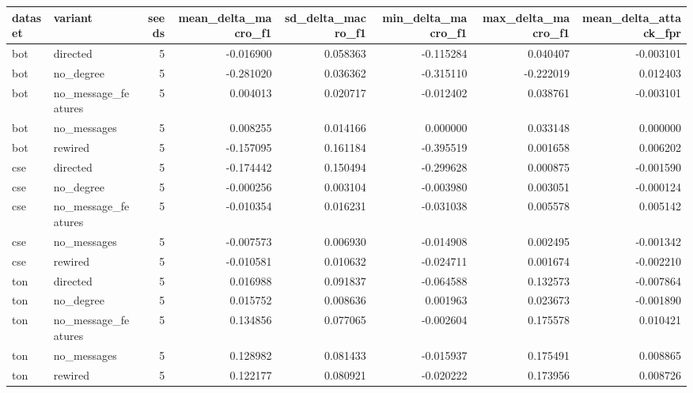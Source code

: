 \begin{tabular}{llrrrrrr}
\toprule
dataset & variant & seeds & mean\_delta\_macro\_f1 & sd\_delta\_macro\_f1 & min\_delta\_macro\_f1 & max\_delta\_macro\_f1 & mean\_delta\_attack\_fpr \\
\midrule
bot & directed & 5 & -0.016900 & 0.058363 & -0.115284 & 0.040407 & -0.003101 \\
bot & no\_degree & 5 & -0.281020 & 0.036362 & -0.315110 & -0.222019 & 0.012403 \\
bot & no\_message\_features & 5 & 0.004013 & 0.020717 & -0.012402 & 0.038761 & -0.003101 \\
bot & no\_messages & 5 & 0.008255 & 0.014166 & 0.000000 & 0.033148 & 0.000000 \\
bot & rewired & 5 & -0.157095 & 0.161184 & -0.395519 & 0.001658 & 0.006202 \\
cse & directed & 5 & -0.174442 & 0.150494 & -0.299628 & 0.000875 & -0.001590 \\
cse & no\_degree & 5 & -0.000256 & 0.003104 & -0.003980 & 0.003051 & -0.000124 \\
cse & no\_message\_features & 5 & -0.010354 & 0.016231 & -0.031038 & 0.005578 & 0.005142 \\
cse & no\_messages & 5 & -0.007573 & 0.006930 & -0.014908 & 0.002495 & -0.001342 \\
cse & rewired & 5 & -0.010581 & 0.010632 & -0.024711 & 0.001674 & -0.002210 \\
ton & directed & 5 & 0.016988 & 0.091837 & -0.064588 & 0.132573 & -0.007864 \\
ton & no\_degree & 5 & 0.015752 & 0.008636 & 0.001963 & 0.023673 & -0.001890 \\
ton & no\_message\_features & 5 & 0.134856 & 0.077065 & -0.002604 & 0.175578 & 0.010421 \\
ton & no\_messages & 5 & 0.128982 & 0.081433 & -0.015937 & 0.175491 & 0.008865 \\
ton & rewired & 5 & 0.122177 & 0.080921 & -0.020222 & 0.173956 & 0.008726 \\
\bottomrule
\end{tabular}
